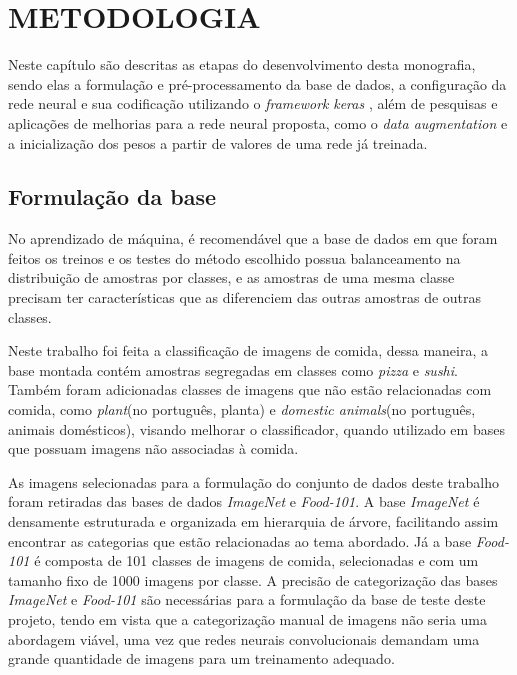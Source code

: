 
\chapter{METODOLOGIA}
\label{chap:metodologia}
Neste capítulo são descritas as etapas do desenvolvimento desta monografia, sendo elas a formulação e pré-processamento da base de dados, a configuração da rede neural e sua codificação utilizando o \textit{framework} \textit{keras} \cite{chollet2015keras}, além de pesquisas e aplicações de melhorias para a rede neural proposta, como o \textit{data augmentation} e a inicialização dos pesos a partir de valores de uma rede já treinada.

\section{Formulação da base}
No aprendizado de máquina, é recomendável que a base de dados em que foram feitos os treinos e os testes do método escolhido possua balanceamento na distribuição de amostras por classes, e as amostras de uma mesma classe precisam ter características que as diferenciem das outras amostras de outras classes.

\par Neste trabalho foi feita a classificação de imagens de comida, dessa maneira, a base montada contém amostras segregadas em classes como \textit{pizza} e \textit{sushi}. Também foram adicionadas classes de imagens que não estão relacionadas com comida, como \textit{plant}(no português, planta) e \textit{domestic animals}(no português, animais domésticos), visando melhorar o classificador, quando utilizado em bases que possuam imagens não associadas à comida.
\par As imagens selecionadas para a formulação do conjunto de dados deste trabalho foram retiradas das bases de dados \textit{ImageNet}\cite{deng2009imagenet} e \textit{Food-101}\cite{bossard14}. A base \textit{ImageNet} é densamente estruturada e organizada em hierarquia de árvore, facilitando assim encontrar as categorias que estão relacionadas ao tema abordado. Já a base \textit{Food-101} é composta de 101 classes de imagens de comida, selecionadas e com um tamanho fixo de 1000 imagens por classe. A precisão de categorização das bases \textit{ImageNet} e \textit{Food-101} são necessárias para a formulação da base de teste deste projeto, tendo em vista que a categorização manual de imagens não seria uma abordagem viável, uma vez que redes neurais convolucionais demandam uma grande quantidade de imagens para um treinamento adequado.  

